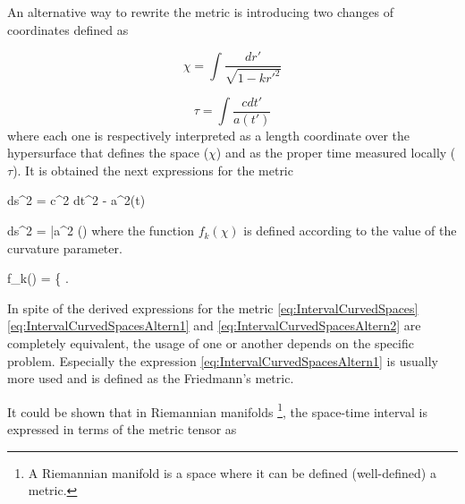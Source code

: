 An alternative way to rewrite the metric is introducing two changes of 
coordinates defined as



\[ \chi = \int \frac{ dr'}{\sqrt{1 - k r'^2}}\]


\[ \tau = \int \frac{ c dt'}{a(t')}\]
where each one is respectively interpreted as a length coordinate over the 
hypersurface that defines the space ($\chi$) and as the proper time 
measured locally ($\tau$). It is obtained the next expressions for the 
metric



{ ds^2 = c^2 dt^2 - a^2(t)  }


{ ds^2 = \bar a^2 (\tau) }
where the function $f_k(\chi)$ is defined according to the value of the 
curvature parameter.



{ f_k(\chi) = \left\{   \right.  }


In spite of the derived expressions for the metric 
\ref{eq:IntervalCurvedSpaces} \ref{eq:IntervalCurvedSpacesAltern1} and
\ref{eq:IntervalCurvedSpacesAltern2} are completely equivalent, the usage
of one or another depends on the specific problem. Especially the 
expression \ref{eq:IntervalCurvedSpacesAltern1} is usually more used and
is defined as the Friedmann's metric.


It could be shown that in Riemannian manifolds \footnote{A Riemannian 
manifold is a space where it can be defined (well-defined) a metric.},
the space-time interval is expressed in terms of the metric tensor as
\cite{weinberg1972}


